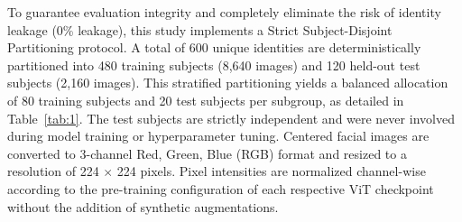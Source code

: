 To guarantee evaluation integrity and completely eliminate the risk of identity leakage (0\% leakage), this study implements a Strict Subject-Disjoint Partitioning protocol. A total of 600 unique identities are deterministically partitioned into 480 training subjects (8,640 images) and 120 held-out test subjects (2,160 images). This stratified partitioning yields a balanced allocation of 80 training subjects and 20 test subjects per subgroup, as detailed in Table~\ref{tab:1}. The test subjects are strictly independent and were never involved during model training or hyperparameter tuning. Centered facial images are converted to 3-channel Red, Green, Blue (RGB) format and resized to a resolution of 224 $\times$ 224 pixels. Pixel intensities are normalized channel-wise according to the pre-training configuration of each respective ViT checkpoint without the addition of synthetic augmentations.
